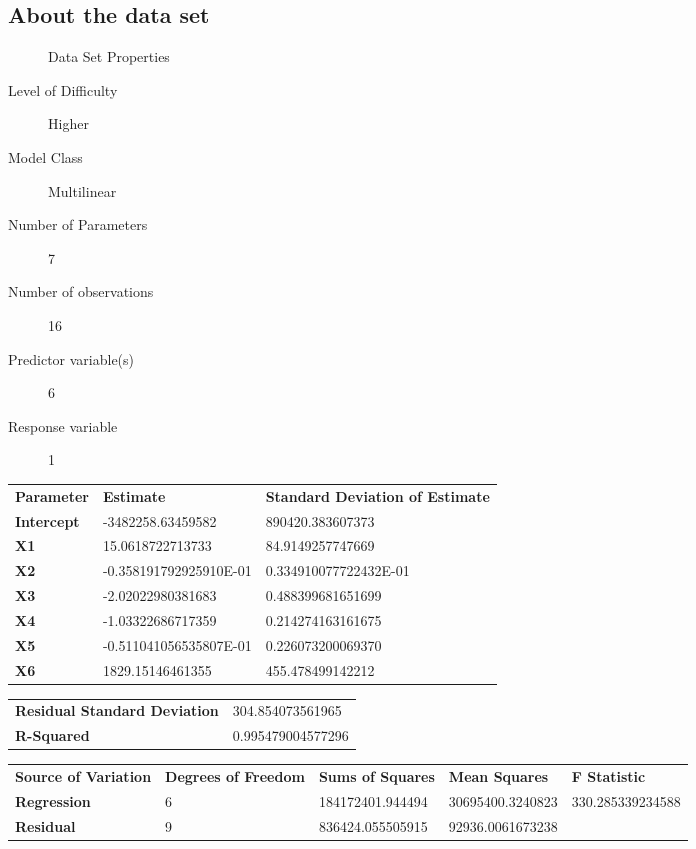 \documentclass[10pt]{article}
\begin{document}
\subsection*{About the data set}

\begin{description}
   \item[]Data Set Properties
   \item[Level of Difficulty] Higher
   \item[Model Class] Multilinear
   \item[Number of Parameters] 7
   \item[Number of observations] 16
   \item[Predictor variable(s)] 6
   \item[Response variable] 1
\end{description}

\begin{tabular}{lll}
   \textbf{Parameter} & \textbf{Estimate} & \textbf{Standard Deviation of Estimate}  \\ 
   \textbf{Intercept} &  -3482258.63459582    &    890420.383607373 \\ 
	\textbf{X1} &   15.0618722713733    &    84.9149257747669   \\
   \textbf{X2} &   -0.358191792925910E-01  &      0.334910077722432E-01   \\
   \textbf{X3} &   -2.02022980381683     &   0.488399681651699  \\
   \textbf{X4} &   -1.03322686717359    &    0.214274163161675   \\
   \textbf{X5} &   -0.511041056535807E-01   &     0.226073200069370   \\
   \textbf{X6} &   1829.15146461355    &    455.478499142212   \\
\end{tabular} 

\begin{tabular}{ll}
    \textbf{Residual Standard Deviation} &   304.854073561965 \\ 
    \textbf{R-Squared} &  0.995479004577296  \\  
\end{tabular}


\begin{tabular}{lllll}
   \textbf{Source of Variation} & \textbf{Degrees of Freedom} & \textbf{Sums of Squares} & \textbf{Mean Squares}  & \textbf{F Statistic} \\ 
  \textbf{Regression} &  6  & 184172401.944494 &	30695400.3240823	& 330.285339234588  \\ 
	\textbf{Residual} &  9  & 836424.055505915 &	92936.0061673238 \\ 
\end{tabular} 
\end{document}
